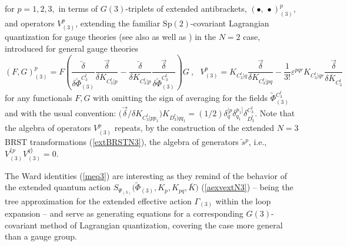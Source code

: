 \documentclass[10pt]{article}
\begin{document}
for $p=1,2,3,$  in terms of $G(3)$-triplets of extended antibrackets, $\left(  \bullet , \, \bullet\right)_ {(3)}^{p}$,  and operators $V_{(3)}^{p}$, extending
the familiar $\mathrm{Sp}\left(2\right)$-covariant Lagrangian quantization for gauge
theories \cite{bltsp2, BLT2} (see also \cite{henneauxsp2, hullsp2, Barnich} as well as  \cite{MR2, MR3, MR4}) in the $N=2$ case, introduced for general gauge theories
\begin{equation}
\left(  F,G\right)_{(3)} ^{p}= F\left(  \frac{\overleftarrow{\delta}%
}{\delta\widetilde{\Phi}_{(3)}^{C^t_3}}\frac{\overrightarrow{\delta}}{\delta K_{C^t_3|p}}-\frac{\overleftarrow{\delta}}{\delta K_{C^t_3|p}}%
\frac{\overrightarrow{\delta}}{\delta\widetilde{\Phi}_{(3)}^{C^t_3}}\right)  G\ ,\ \ \ V_{(3)}^{p}%
=K_{{C^t_3}|q}\frac{\overrightarrow{\delta}%
}{\delta{K_{{C^t_3}|pq}}}- \frac{1}{3!} \varepsilon^{pqr} K_{{C^t_3}|qr} \frac{\overrightarrow{\delta}%
}{\delta \overline{K}_{C^t_3}}  \label{eN3br}%
\end{equation}
for any functionals $F,G$ with omitting the sign of averaging for the fields $\widetilde{\Phi}{}_{(3)}^{C^t_3}$ and with the usual convention: $\big({\overrightarrow{\delta}}/{\delta K_{C^t_3|pp_1}}\big)K_{D^t_3|qq_1} = (1/2) \delta^{[p}_q\delta^{p_1]}_{q_1}\delta^{C^t_3}_{D^t_3}$. Note that the algebra
of operators $V^p_{(3)}$ repeats, by the construction of the extended $N=3$ BRST transformations (\ref{extBRSTN3}),  the algebra of generators $\overleftarrow{s}{}^p$, i.e.,
$V_{(3)}^{\{p}V_{(3)}^{q\}}=0$.

The Ward identities (\ref{meq3}) are interesting as they remind of the behavior
of the extended quantum action ${S}_{\Psi_{(3)}}\big(\widetilde{\Phi}_{(3)},
K_p, K_{pq}, \overline{K}\big)$ (\ref{aexvextN3}) -- being the tree approximation for the extended
effective action $\Gamma_{(3)}$ within the loop expansion -- and serve as generating equations
for a corresponding $G(3)$-covariant method of Lagrangian quantization, covering the case
more general than a gauge group.
\end{document}
